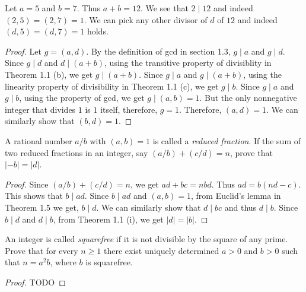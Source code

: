 \begin{example}
  Let \( a = 5 \) and \( b = 7 \). Thus \( a + b = 12 \). We see that
  \( 2 \mid 12 \) and indeed \( (2, 5) = (2, 7) = 1 \). We can pick
  any other divisor of \( d \) of \( 12 \) and indeed \( (d, 5) = (d,
  7) = 1 \) holds.
\end{example}

\begin{proof}
  Let \( g = (a, d) \). By the definition of gcd in section 1.3, \( g
  \mid a \) and \( g \mid d \). Since \( g \mid d \) and \( d \mid (a
  + b) \), using the transitive property of divisiblity in Theorem 1.1
  (b), we get \( g \mid (a + b) \). Since \( g \mid a \) and \( g \mid
  (a + b) \), using the linearity property of divisibility in Theorem
  1.1 (c), we get \( g \mid b \). Since \( g \mid a \) and \( g \mid b
  \), using the property of gcd, we get \( g \mid (a, b) = 1 \). But
  the only nonnegative integer that divides \( 1 \) is \( 1 \) itself,
  therefore, \( g = 1 \). Therefore, \( (a, d) = 1 \). We can
  similarly show that \( (b, d) = 1 \).
\end{proof}


\begin{exercise}{7}{}
  A rational number \( a/b \) with \( (a, b) = 1 \) is called a
  \emph{reduced fraction}. If the sum of two reduced fractions in an
  integer, say \( (a/b) + (c/d) = n \), prove that \( \lvert -b \rvert
  = \lvert d \rvert \).
\end{exercise}

\begin{proof}
  Since \( (a/b) + (c/d) = n \), we get \( ad + bc = nbd \). Thus \(
  ad = b(nd - c) \). This shows that \( b \mid ad \). Since \( b \mid
  ad \) and \( (a, b) = 1 \), from Euclid's lemma in Theorem 1.5 we
  get, \( b \mid d \). We can similarly show that \( d \mid bc \) and
  thus \( d \mid b \). Since \( b \mid d \) and \( d \mid b \), from
  Theorem 1.1 (i), we get \( \lvert d \rvert = \lvert b \rvert \).
\end{proof}


\begin{exercise}{8}{}
  An integer is called \emph{squarefree} if it is not divisible by the
  square of any prime. Prove that for every \( n \ge 1 \) there exist
  uniquely determined \( a > 0 \) and \( b > 0 \) such that \( n = a^2
  b \), where \( b \) is squarefree.
\end{exercise}

\begin{proof}
  TODO
\end{proof}
